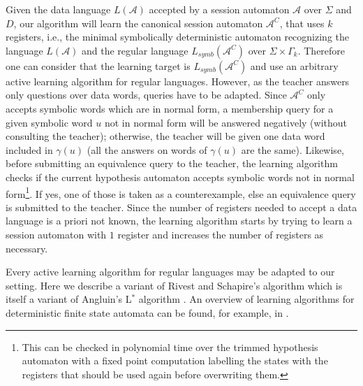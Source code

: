 \documentclass{LMCS}
\def\A{\mathcal A}
\newcommand{\symbL}{L_\mathit{symb}}
\newcommand{\can}[1]{#1^{C}}
\begin{document}
Given the data language $ L(\A)$ accepted by a session automaton $\A$
over $\Sigma$ and $D$, our algorithm will learn the canonical session
automaton $\can{\A}$, that uses $k$ registers, i.e., the minimal
symbolically deterministic automaton recognizing the language $L(\A)$
and the regular language $\symbL(\can{\A})$ over $\Sigma \times
\Gamma_{k}$.  Therefore one can consider that the learning target is
$\symbL(\can{\A})$ and use an arbitrary active learning algorithm for
regular languages. However, as the teacher answers only questions over
data words, queries have to be adapted. Since $\can{\A}$ only accepts
symbolic words which are in normal form, a membership query for a
given symbolic word $u$ not in normal form will be answered negatively
(without consulting the teacher); otherwise, the teacher will be given
one data word included in $\gamma(u)$ (all the answers on words of
$\gamma(u)$ are the same).  Likewise, before submitting an equivalence
query to the teacher, the learning algorithm checks if the current
hypothesis automaton accepts symbolic words not in normal
form\footnote{This can be checked in polynomial time over the trimmed
  hypothesis automaton with a fixed point computation labelling the
  states with the registers that should be used again before
  overwriting them.}. If yes, one of those is taken as a
counterexample, else an equivalence query is submitted to the
teacher. Since the number of registers needed to accept a data
language is a priori not known, the learning algorithm starts by
trying to learn a session automaton with $1$ register and increases
the number of registers as necessary.

Every active learning algorithm for regular languages may be adapted
to our setting.  Here we describe a variant of Rivest and Schapire's
algorithm \cite{RiSh:inference} which is itself a variant of Angluin's
L$^*$ algorithm \cite{Angluin:regset}.  An overview of learning
algorithms for deterministic finite state automata can be found, for
example, in \cite{BergR05}.
\end{document}

